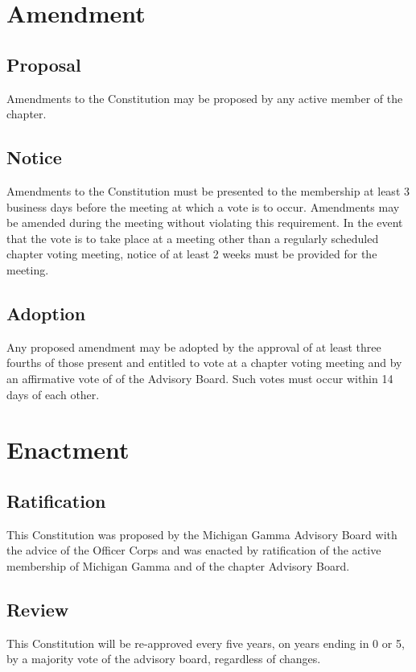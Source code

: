 \chapter{Amendment}
\section{Proposal} Amendments to the Constitution may be proposed by any active member of the chapter.

\section{Notice} Amendments to the Constitution must be presented to the membership at least 3 business days before the meeting at which a vote is to occur. Amendments may be amended during the meeting without violating this requirement. In the event that the vote is to take place at a meeting other than a regularly scheduled chapter voting meeting, notice of at least 2 weeks must be provided for the meeting.

\section{Adoption} Any proposed amendment may be adopted by the approval of at least three fourths of those present and entitled to vote at a chapter voting meeting and by an affirmative vote of   of the Advisory Board. Such votes must occur within 14 days of each other.

\chapter{Enactment}
\section{Ratification} This Constitution was proposed by the Michigan Gamma Advisory Board with the advice of the Officer Corps and was enacted \dateapproved by ratification of the active membership of Michigan Gamma and of the chapter Advisory Board.
\section{Review} This Constitution will be re-approved every five years, on years ending in 0 or 5, by a majority vote of the advisory board, regardless of changes. %